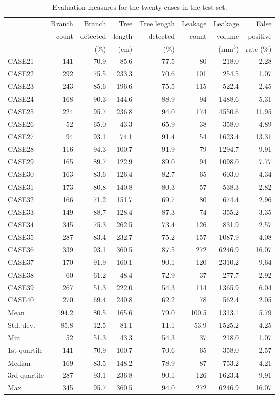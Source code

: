 \begin{table}
\caption{Evaluation measures for the twenty cases in the test set.}
\begin{center}
\begin{tabular}{l||r|r|r|r|r|r|r}
 &Branch&Branch&Tree&Tree length&Leakage&Leakage&False\\
 &count&detected&length&detected&count&volume&positive\\
 &&(\%)&(cm)&(\%)&&(mm$^3$)&rate (\%)\\
\hline
CASE21&141&70.9&85.6&77.5&80&218.0&2.28\\
CASE22&292&75.5&233.3&70.6&101&254.5&1.07\\
CASE23&243&85.6&196.6&75.5&115&522.4&2.45\\
CASE24&168&90.3&144.6&88.9&94&1488.6&5.31\\
CASE25&224&95.7&236.8&94.0&174&4550.6&11.95\\
CASE26&52&65.0&43.3&65.9&38&358.0&4.89\\
CASE27&94&93.1&74.1&91.4&54&1623.4&13.31\\
CASE28&116&94.3&100.7&91.9&79&1294.7&9.91\\
CASE29&165&89.7&122.9&89.0&94&1098.0&7.77\\
CASE30&163&83.6&126.4&82.7&65&603.0&4.34\\
CASE31&173&80.8&140.8&80.3&57&538.3&2.82\\
CASE32&166&71.2&151.7&69.7&80&674.4&2.96\\
CASE33&149&88.7&128.4&87.3&74&355.2&3.35\\
CASE34&345&75.3&262.5&73.4&126&831.9&2.57\\
CASE35&287&83.4&232.7&75.2&157&1087.9&4.08\\
CASE36&339&93.1&360.5&87.5&272&6246.9&16.07\\
CASE37&170&91.9&160.1&90.1&120&2310.2&9.64\\
CASE38&60&61.2&48.4&72.9&37&277.7&2.92\\
CASE39&267&51.3&222.0&54.3&114&1365.9&6.04\\
CASE40&270&69.4&240.8&62.2&78&562.4&2.05\\
\hline
Mean&194.2&80.5&165.6&79.0&100.5&1313.1&5.79\\
Std. dev.&85.8&12.5&81.1&11.1&53.9&1525.2&4.25\\
\hline
Min&52&51.3&43.3&54.3&37&218.0&1.07\\
1st quartile&141&70.9&100.7&70.6&65&358.0&2.57\\
Median&169&83.5&148.2&78.9&87&753.2&4.21\\
3rd quartile&287&93.1&236.8&90.1&126&1623.4&9.91\\
Max&345&95.7&360.5&94.0&272&6246.9&16.07\\
\end{tabular}
\end{center}
\end{table}
